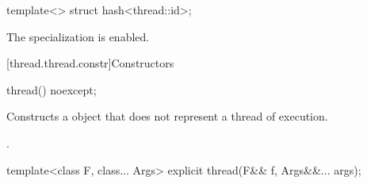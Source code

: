 %
\begin{itemdecl}
template<> struct hash<thread::id>;
\end{itemdecl}

\begin{itemdescr}
\pnum
The specialization is enabled.
\end{itemdescr}

[thread.thread.constr]{Constructors}

%
\begin{itemdecl}
thread() noexcept;
\end{itemdecl}

\begin{itemdescr}
\pnum
\effects
Constructs a  object that does not represent a thread of execution.

\pnum
\ensures
{}.
\end{itemdescr}

%
\begin{itemdecl}
template<class F, class... Args> explicit thread(F&& f, Args&&... args);
\end{itemdecl}


